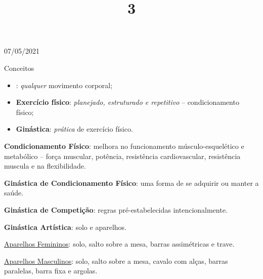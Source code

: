 \documentclass{SchoolBook}
\begin{document}
    \begin{day}{07/05/2021}
        \title{3}{Conceitos}
        
        \begin{itemize}
            \item {}: \textit{qualquer} movimento corporal;
            \item \textbf{Exercício físico}: \textit{planejado, estruturado e repetitivo} -- condicionamento físico;
            \item \textbf{Ginástica}: \textit{prática} de exercício físico.
        \end{itemize}
        
        \textbf{Condicionamento Físico}: melhora no funcionamento músculo-esquelético e metabólico -- força muscular, potência, resistência cardiovascular, resistência muscula e na flexibilidade.
        
        \textbf{Ginástica de Condicionamento Físico}: uma forma de se adquirir ou manter a saúde.
        
        \textbf{Ginástica de Competição}: regras pré-estabelecidas intencionalmente.
        
        \textbf{Ginástica Artística}: solo e aparelhos.
        
        \underline{Aparelhos Femininos}: solo, salto sobre a mesa, barras assimétricas e trave.
        
        \underline{Aparelhos Masculinos}: solo, salto sobre a mesa, cavalo com alças, barras paralelas, barra fixa e argolas.
    \end{day}
    
\end{document}
